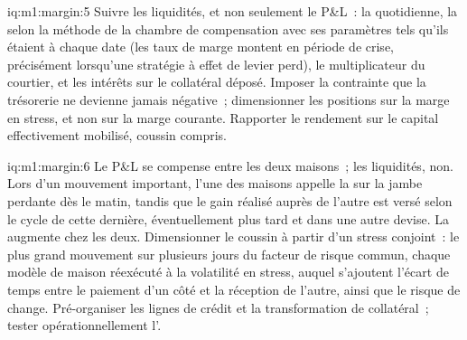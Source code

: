 \begin{solution}{iq:m1:margin:5}
Suivre les liquidités, et non seulement le P\&L~: la  quotidienne, la 
selon la méthode de la chambre de compensation avec ses paramètres tels qu'ils étaient à
chaque date (les taux de marge montent en période de crise, précisément lorsqu'une stratégie
à effet de levier perd), le multiplicateur du courtier, et les intérêts sur le collatéral déposé.
Imposer la contrainte que la trésorerie ne devienne jamais négative~; dimensionner les positions sur
la marge en stress, et non sur la marge courante. Rapporter le rendement sur le capital effectivement
mobilisé, coussin compris.
\end{solution}

\begin{solution}{iq:m1:margin:6}
Le P\&L se compense entre les deux maisons~; les liquidités, non. Lors d'un mouvement important, l'une des
maisons appelle la  sur la jambe perdante dès le matin, tandis que le gain réalisé
auprès de l'autre est versé selon le cycle de cette dernière, éventuellement plus tard et dans une autre
devise. La  augmente chez les deux. Dimensionner le coussin à partir d'un stress conjoint~:
le plus grand mouvement sur plusieurs jours du facteur de risque commun, chaque modèle de maison
réexécuté à la volatilité en stress, auquel s'ajoutent l'écart de temps entre le paiement d'un côté et
la réception de l'autre, ainsi que le risque de change. Pré-organiser les lignes de crédit et la transformation
de collatéral~; tester opérationnellement l'.
\end{solution}
